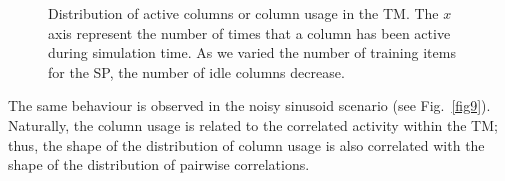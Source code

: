 \documentclass[11pt,letterpaper]{article}
\begin{document}
\begin{figure}[t]
{	    			\label{fig8:c}
		    	}
			    \caption{
			        Distribution of active columns or column usage in the TM. The $x$
			        axis represent the number of times that a column has
			        been active during simulation time.
			        As we varied the number of training items for the SP,
			        the number of idle columns decrease.
			    }
			    \label{fig8}
		    \end{figure}

            The same behaviour is observed in the noisy sinusoid scenario (see Fig.~\ref{fig9}).
            Naturally, the column usage is related to the correlated activity within the TM;
            thus, the shape of the distribution of column usage is also correlated with the shape of the
            distribution of pairwise correlations.
		    
\end{document}
